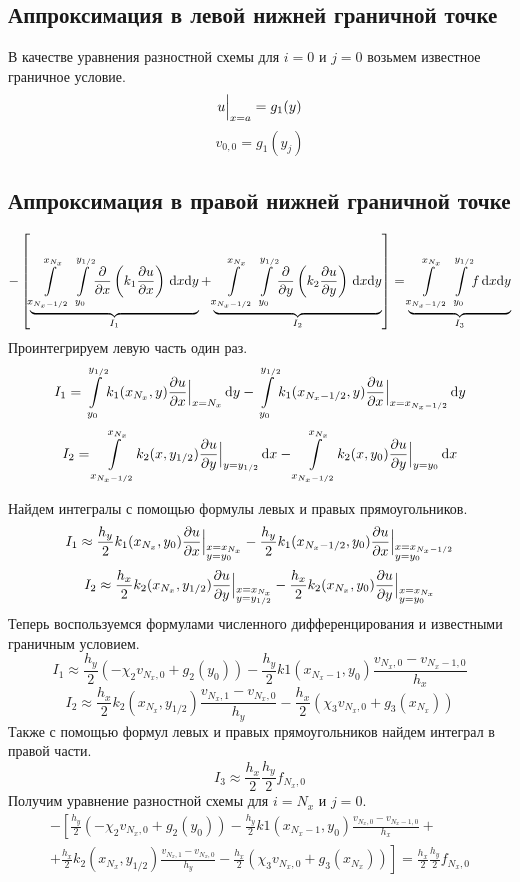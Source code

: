 \subsection{Аппроксимация в левой нижней граничной точке}
В качестве уравнения разностной схемы для $i = 0$ и $j = 0$ возьмем
известное граничное условие.
\[ u \Big\vert_{x = a} = g_1(y) \]
\[ v_{0,0} = g_1(y_j) \]

\subsection{Аппроксимация в правой нижней граничной точке}
\[
  - \left[
  \underbrace{ \int\limits_{x_{N_x - 1/2}}^{x_{N_x}}\int\limits_{y_{0}}^{y_{1/2}} \! \pdv{x}\left( k_1 \pdv{u}{x} \right) \, \dd x \dd y }_{I_1} +
  \underbrace{ \int\limits_{x_{N_x - 1/2}}^{x_{N_x}}\int\limits_{y_{0}}^{y_{1/2}} \! \pdv{y}\left( k_2 \pdv{u}{y} \right) \, \dd x \dd y }_{I_2}
  \right] =
  \underbrace{ \int\limits_{x_{N_x - 1/2}}^{x_{N_x}}\int\limits_{y_{0}}^{y_{1/2}} \! f \, \dd x \dd y }_{I_3}
\]
Проинтегрируем левую часть один раз.
\[ I_1 = \int\limits_{y_{0}}^{y_{1/2}} \! k_1(x_{N_x},y) \pdv{u}{x} \Big\vert_{x = N_x} \, \dd y - \int\limits_{y_{0}}^{y_{1/2}} \! k_1(x_{N_x-1/2},y) \pdv{u}{x} \Big\vert_{x = x_{N_x-1/2}} \, \dd y \]
\[ I_2 = \int\limits_{x_{N_x - 1/2}}^{x_{N_x}} \! k_2(x,y_{1/2}) \pdv{u}{y} \Big\vert_{y = y_{1/2}} \, \dd x - \int\limits_{x_{N_x - 1/2}}^{x_{N_x}} \! k_2(x,y_{0}) \pdv{u}{y} \Big\vert_{y = y_{0}} \, \dd x \]

Найдем интегралы с помощью формулы левых и правых прямоугольников.
\[ I_1 \approx \frac{h_y}{2} k_1(x_{N_x},y_{0}) \pdv{u}{x} \Big\vert_{\begin{subarray}{l} x = x_{N_x} \\ y = y_{0} \end{subarray}} - \frac{h_y}{2} k_1(x_{N_x-1/2},y_{0}) \pdv{u}{x} \Big\vert_{\begin{subarray}{l} x = x_{N_x-1/2} \\ y = y_{0} \end{subarray}} \]
\[ I_2 \approx \frac{h_x}{2} k_2(x_{N_x},y_{1/2}) \pdv{u}{y} \Big\vert_{\begin{subarray}{l} x = x_{N_x} \\ y = y_{1/2} \end{subarray}} - \frac{h_x}{2} k_2(x_{N_x},y_{0}) \pdv{u}{y} \Big\vert_{\begin{subarray}{l} x = x_{N_x} \\ y = y_{0} \end{subarray}} \]
Теперь воспользуемся формулами численного дифференцирования и известными граничным условием.
\[ I_1 \approx \frac{h_y}{2} (- \chi_2 v_{N_x, 0} + g_2(y_{0})) - \frac{h_y}{2} k1(x_{N_x -1}, y_{0}) \frac{v_{N_x,0} - v_{N_x-1,0}}{h_x} \]
\[ I_2 \approx \frac{h_x}{2} k_2(x_{N_x},y_{1/2}) \frac{v_{N_x,1} - v_{N_x,0}}{h_y} - \frac{h_x}{2} (\chi_3 v_{N_x, 0} + g_3(x_{N_x}))\]
Также с помощью формул левых и правых прямоугольников найдем интеграл в правой части.
\[ I_3 \approx \frac{h_x}{2} \frac{h_y}{2} f_{N_x, 0} \]
Получим уравнение разностной схемы для $i = N_x$ и $j = 0$.
\begin{multline*}
  - \left[
    \frac{h_y}{2} (- \chi_2 v_{N_x, 0} + g_2(y_{0})) - \frac{h_y}{2} k1(x_{N_x -1}, y_{0}) \frac{v_{N_x,0} - v_{N_x-1,0}}{h_x} + \right. \\
  \left. +
  \frac{h_x}{2} k_2(x_{N_x},y_{1/2}) \frac{v_{N_x,1} - v_{N_x,0}}{h_y} - \frac{h_x}{2} (\chi_3 v_{N_x, 0} + g_3(x_{N_x}))
  \right] =
  \frac{h_x}{2} \frac{h_y}{2} f_{N_x, 0} 
\end{multline*}

